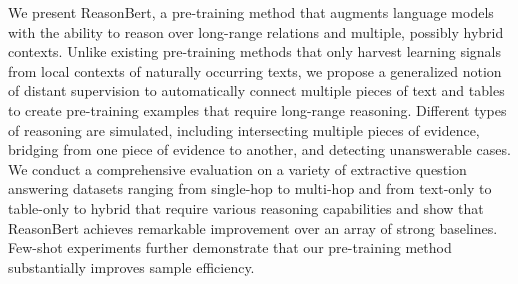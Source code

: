 We present ReasonBert, a pre-training method that augments language models with the ability to reason over long-range relations and multiple, possibly hybrid contexts.  Unlike existing pre-training methods that only harvest learning signals from local contexts of naturally occurring texts, we propose a generalized notion of distant supervision to automatically connect multiple pieces of text and tables to create pre-training examples that require long-range reasoning.  Different types of reasoning are simulated,  including intersecting multiple pieces of evidence,  bridging from one piece of evidence to another, and detecting unanswerable cases.   We conduct a  comprehensive evaluation on a variety of extractive question answering datasets ranging from single-hop to multi-hop and from text-only to table-only to hybrid that require various reasoning capabilities and show that  ReasonBert achieves remarkable improvement over an array of strong baselines.   Few-shot experiments further demonstrate that our pre-training method substantially improves sample efficiency.

